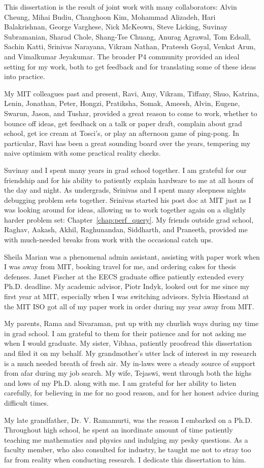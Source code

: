 This dissertation is the result of joint work with many collaborators: Alvin
Cheung, Mihai Budiu, Changhoon Kim, Mohammad Alizadeh, Hari Balakrishnan,
George Varghese, Nick McKeown, Steve Licking, Suvinay Subramanian, Sharad
Chole, Shang-Tse Chuang, Anurag Agrawal, Tom Edsall, Sachin Katti, Srinivas
Narayana, Vikram Nathan, Prateesh Goyal, Venkat Arun, and Vimalkumar Jeyakumar.
The broader P4 community provided an ideal setting for my work, both to get
feedback and for translating some of these ideas into practice. 

My MIT colleagues past and present, Ravi, Amy, Vikram, Tiffany, Shuo,
Katrina, Lenin, Jonathan, Peter, Hongzi, Pratiksha, Somak, Ameesh, Alvin,
Eugene, Swarun, Jason, and Tushar, provided a great reason to come to work, whether to bounce
off ideas, get feedback on a talk or paper draft, complain about grad school,
get ice cream at Tosci's, or play an afternoon game of ping-pong. In
particular, Ravi has been a great sounding board over the years, tempering my
naive optimism with some practical reality checks.

Suvinay and I spent many years in grad school together.  I am grateful for our
friendship and for his ability to patiently explain hardware to me at all hours
of the day and night. As undergrads, Srinivas and I spent many sleepness nights
debugging problem sets together. Srinivas started his post doc at MIT just as I
was looking around for ideas, allowing us to work together again on a slightly
harder problem set: Chapter~\ref{chap:perf_query}.  My friends outside grad school, Raghav,
Aakash, Akhil, Raghunandan, Siddharth, and Praneeth, provided me with
much-needed breaks from work with the occasional catch ups.

Sheila Marian was a phenomenal admin assistant, assisting with paper work when
I was away from MIT, booking travel for me, and ordering cakes for thesis
defenses. Janet Fischer at the EECS graduate office patiently extended every
Ph.D.  deadline. My academic advisor, Piotr Indyk, looked out for me since my
first year at MIT, especially when I was switching advisors.  Sylvia Hiestand
at the MIT ISO got all of my paper work in order
during my year away from MIT.

My parents, Rama and Sivaraman, put up with my churlish ways during my time in
grad school. I am grateful to them for their patience and for not asking me
when I would graduate. My sister, Vibhaa, patiently proofread this dissertation
and filed it on my behalf.  My
grandmother's utter lack of interest in my research is a much needed breath of
fresh air. My in-laws were a steady source of support from afar during my job
search. My wife, Tejaswi, went through both the highs and lows of my Ph.D.
along with me. I am grateful for her ability to listen carefully, for believing
in me for no good reason, and for her honest advice during difficult times. 

My late grandfather, Dr. V. Ramamurti, was the reason I embarked on a Ph.D.
Throughout high school, he spent an inordinate amount of time patiently
teaching me mathematics and physics and indulging my pesky questions. As a
faculty member, who also consulted for industry, he taught me not to stray too
far from reality when conducting research. I dedicate this dissertation to him.
